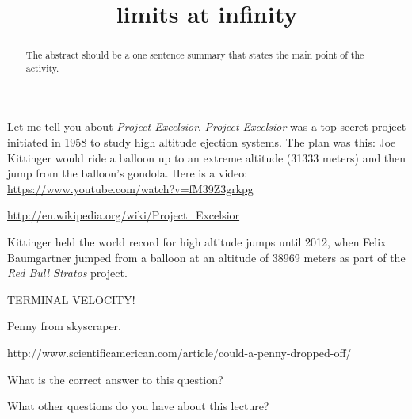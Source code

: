 \documentclass{ximera}
\title{limits at infinity}
\begin{document}
\begin{abstract}
  The abstract should be a one sentence summary that states the main point of the activity.
\end{abstract}
\maketitle

Let me tell you about \textit{Project Excelsior}. \textit{Project
  Excelsior} was a top secret project initiated in 1958 to study high
altitude ejection systems. The plan was this: Joe Kittinger would ride
a balloon up to an extreme altitude (31333 meters) and then jump from
the balloon's gondola. Here is a video:
\url{https://www.youtube.com/watch?v=fM39Z3grkpg}

\url{http://en.wikipedia.org/wiki/Project_Excelsior}

Kittinger held the world record for high altitude jumps until 2012, when Felix Baumgartner jumped from a balloon at an altitude of 38969 meters as part of the \textit{Red Bull Stratos} project. 

TERMINAL VELOCITY!


Penny from skyscraper. 

http://www.scientificamerican.com/article/could-a-penny-dropped-off/

\begin{question}
  What is the correct answer to this question?

  \begin{solution}
    \begin{multiple-choice}
    \end{multiple-choice}  
  \end{solution}
\end{question}

What other questions do you have about this lecture?
\begin{free-response}
\end{free-response}
\end{document}
